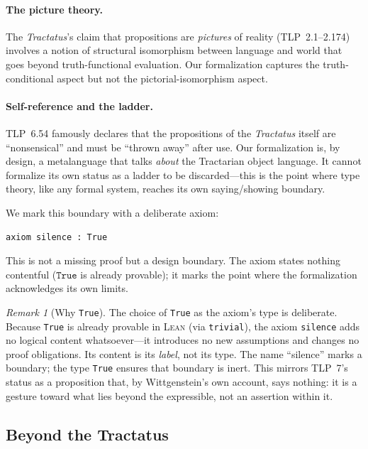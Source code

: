 \documentclass[10pt, letterpaper]{article}
\theoremstyle{definition}
\theoremstyle{remark}
\newtheorem{remark}[theorem]{Remark}
\newcommand{\Lean}{\textsc{Lean}}
\begin{document}
\paragraph{The picture theory.}
The \emph{Tractatus}'s claim that propositions are
\emph{pictures} of reality (TLP~2.1--2.174) involves a notion
of structural isomorphism between language and world that goes
beyond truth-functional evaluation.  Our formalization captures
the truth-conditional aspect but not the pictorial-isomorphism
aspect.

\paragraph{Self-reference and the ladder.}
TLP~6.54 famously declares that the propositions of the
\emph{Tractatus} itself are ``nonsensical'' and must be ``thrown
away'' after use.  Our formalization is, by design, a
metalanguage that talks \emph{about} the Tractarian object
language.  It cannot formalize its own status as a ladder to be
discarded---this is the point where type theory, like any formal
system, reaches its own saying/showing boundary.

We mark this boundary with a deliberate axiom:

\begin{lstlisting}
axiom silence : True
\end{lstlisting}

\noindent
This is not a missing proof but a design boundary.  The axiom
states nothing contentful ($\mathtt{True}$ is already provable);
it marks the point where the formalization acknowledges its own
limits.

\begin{remark}[Why \texttt{True}]
\label{rem:why-true}
The choice of \texttt{True} as the axiom's type is deliberate.
Because \texttt{True} is already provable in \Lean{} (via
\texttt{trivial}), the axiom \texttt{silence} adds no logical
content whatsoever---it introduces no new assumptions and
changes no proof obligations.  Its content is its \emph{label},
not its type.  The name ``silence'' marks a boundary; the
type \texttt{True} ensures that boundary is inert.  This
mirrors TLP~7's status as a proposition that, by Wittgenstein's
own account, says nothing: it is a gesture toward what lies
beyond the expressible, not an assertion within it.
\end{remark}

\subsection{Beyond the Tractatus}
\label{sec:beyond}
\end{document}
